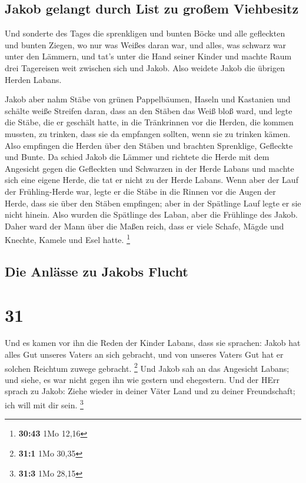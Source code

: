 \hypertarget{jakob-gelangt-durch-list-zu-grouxdfem-viehbesitz}{%
\subsection{Jakob gelangt durch List zu großem
Viehbesitz}\label{jakob-gelangt-durch-list-zu-grouxdfem-viehbesitz}}

 Und sonderte des Tages die sprenkligen und bunten Böcke
und alle gefleckten und bunten Ziegen, wo nur was Weißes daran war, und
alles, was schwarz war unter den Lämmern, und tat's unter die Hand
seiner Kinder  und machte Raum drei Tagereisen weit
zwischen sich und Jakob. Also weidete Jakob die übrigen Herden Labans.

 Jakob aber nahm Stäbe von grünen Pappelbäumen, Haseln
und Kastanien und schälte weiße Streifen daran, dass an den Stäben das
Weiß bloß ward,  und legte die Stäbe, die er geschält
hatte, in die Tränkrinnen vor die Herden, die kommen mussten, zu
trinken, dass sie da empfangen sollten, wenn sie zu trinken kämen.
 Also empfingen die Herden über den Stäben und brachten
Sprenklige, Gefleckte und Bunte.  Da schied Jakob die
Lämmer und richtete die Herde mit dem Angesicht gegen die Gefleckten und
Schwarzen in der Herde Labans und machte sich eine eigene Herde, die tat
er nicht zu der Herde Labans.  Wenn aber der Lauf der
Frühling-Herde war, legte er die Stäbe in die Rinnen vor die Augen der
Herde, dass sie über den Stäben empfingen;  aber in der
Spätlinge Lauf legte er sie nicht hinein. Also wurden die Spätlinge des
Laban, aber die Frühlinge des Jakob.  Daher ward der Mann
über die Maßen reich, dass er viele Schafe, Mägde und Knechte, Kamele
und Esel hatte. \footnote{\textbf{30:43} 1Mo 12,16}

\hypertarget{die-anluxe4sse-zu-jakobs-flucht}{%
\subsection{Die Anlässe zu Jakobs
Flucht}\label{die-anluxe4sse-zu-jakobs-flucht}}

\hypertarget{section-30}{%
\section{31}\label{section-30}}

 Und es kamen vor ihn die Reden der Kinder Labans, dass
sie sprachen: Jakob hat alles Gut unseres Vaters an sich gebracht, und
von unseres Vaters Gut hat er solchen Reichtum zuwege gebracht.
\footnote{\textbf{31:1} 1Mo 30,35}  Und Jakob sah an das
Angesicht Labans; und siehe, es war nicht gegen ihn wie gestern und
ehegestern.  Und der HErr sprach zu Jakob: Ziehe wieder in
deiner Väter Land und zu deiner Freundschaft; ich will mit dir sein.
\footnote{\textbf{31:3} 1Mo 28,15}


